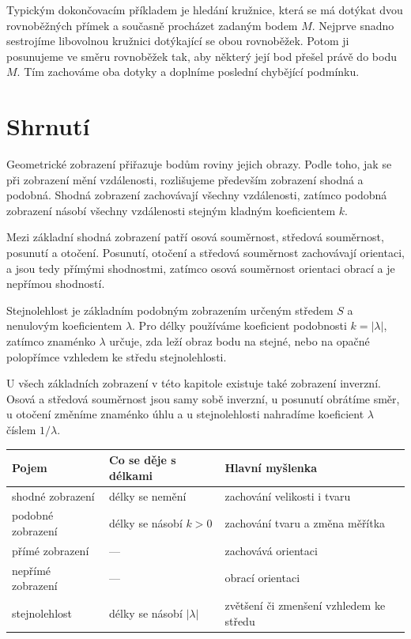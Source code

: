 \documentclass[12pt,a4paper]{article}
\begin{document}
\begin{examplebox}
    Typickým dokončovacím příkladem je hledání kružnice, která se má dotýkat dvou rovnoběžných přímek a současně procházet zadaným bodem $M$. Nejprve snadno sestrojíme libovolnou kružnici dotýkající se obou rovnoběžek. Potom ji posunujeme ve směru rovnoběžek tak, aby některý její bod přešel právě do bodu $M$. Tím zachováme oba dotyky a doplníme poslední chybějící podmínku.
\end{examplebox}


\section{Shrnutí}

Geometrické zobrazení přiřazuje bodům roviny jejich obrazy. Podle toho, jak se při zobrazení mění vzdálenosti, rozlišujeme především zobrazení shodná a podobná. Shodná zobrazení zachovávají všechny vzdálenosti, zatímco podobná zobrazení násobí všechny vzdálenosti stejným kladným koeficientem $k$.

Mezi základní shodná zobrazení patří osová souměrnost, středová souměrnost, posunutí a otočení. Posunutí, otočení a středová souměrnost zachovávají orientaci, a jsou tedy přímými shodnostmi, zatímco osová souměrnost orientaci obrací a je nepřímou shodností.

Stejnolehlost je základním podobným zobrazením určeným středem $S$ a nenulovým koeficientem $\lambda$. Pro délky používáme koeficient podobnosti $k=|\lambda|$, zatímco znaménko $\lambda$ určuje, zda leží obraz bodu na stejné, nebo na opačné polopřímce vzhledem ke středu stejnolehlosti.


U všech základních zobrazení v této kapitole existuje také zobrazení inverzní. Osová a středová souměrnost jsou samy sobě inverzní, u posunutí obrátíme směr, u otočení změníme znaménko úhlu a u stejnolehlosti nahradíme koeficient $\lambda$ číslem $1/\lambda$.

\begin{center}
\begin{tabular}{|C{4.1cm}|C{4.4cm}|C{5.0cm}|}
    \hline
    \textbf{Pojem} & \textbf{Co se děje s délkami} & \textbf{Hlavní myšlenka} \\
    \hline
    shodné zobrazení & délky se nemění & zachování velikosti i tvaru \\
    \hline
    podobné zobrazení & délky se násobí $k>0$ & zachování tvaru a změna měřítka \\
    \hline
    přímé zobrazení & --- & zachovává orientaci \\
    \hline
    nepřímé zobrazení & --- & obrací orientaci \\
    \hline
    stejnolehlost & délky se násobí $|\lambda|$ & zvětšení či zmenšení vzhledem ke středu \\
    \hline
\end{tabular}
\end{center}
\end{document}
